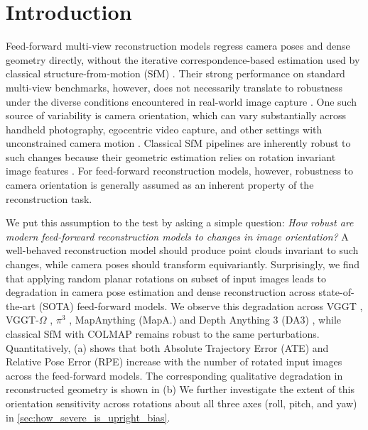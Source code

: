 \section{Introduction}
Feed-forward multi-view reconstruction models \citep{wang2025vggt, wang2025pi, depthanything3, wang2026vggtomega, dust3r_cvpr24} regress camera poses and dense geometry directly, without the iterative correspondence-based estimation used by classical structure-from-motion (SfM) \citep{structurefrommotion1, structurefrommotion2, structurefrommotion3}. Their strong performance on standard multi-view benchmarks, however, does not necessarily translate to robustness under the diverse conditions encountered in real-world image capture \citep{liu2026realx3d}. One such source of variability is camera orientation, which can vary substantially across handheld photography, egocentric video capture, and other settings with unconstrained camera motion \citep{xian2019uprightnet}. Classical SfM pipelines are inherently robust to such changes because their geometric estimation relies on rotation invariant image features \citep{SIFTpaper}. For feed-forward reconstruction models, however, robustness to camera orientation is generally assumed as an inherent property of the reconstruction task.

We put this assumption to the test by asking a simple question: \emph{How robust are modern feed-forward reconstruction models to changes in image orientation?} 
A well-behaved reconstruction model should produce point clouds invariant to such changes, while camera poses should transform equivariantly.
Surprisingly, we find that applying random planar rotations on subset of input images leads to degradation in camera pose estimation and dense reconstruction across state-of-the-art (SOTA) feed-forward models. 
We observe this degradation across VGGT \citep{wang2025vggt}, VGGT-$\Omega$ \citep{wang2026vggtomega}, $\pi^3$ \citep{wang2025pi}, MapAnything (MapA.) \citep{keetha2026mapanything} and Depth Anything 3 (DA3) \citep{depthanything3}, while classical SfM with COLMAP \citep{colmap} remains robust to the same perturbations.
Quantitatively, (a) shows that both Absolute Trajectory Error (ATE) and Relative Pose Error (RPE) increase with the number of rotated input images across the feed-forward models. The corresponding qualitative degradation in reconstructed geometry is shown in (b)
We further investigate the extent of this orientation sensitivity across rotations about all three axes (roll, pitch, and yaw) in \cref{sec:how_severe_is_upright_bias}.

